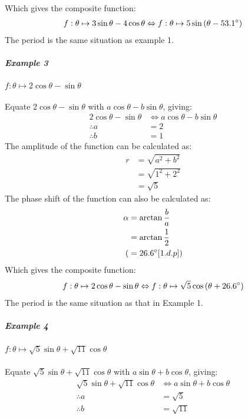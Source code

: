\documentclass{article}
\begin{document}
        Which gives the composite function:
        \begin{align*}
        f:\theta \mapsto 3\sin{\theta} - 4\cos{\theta} \Leftrightarrow f:\theta \mapsto 5\sin{(\theta - 53.1\degree)}
        \end{align*}
        The period is the same situation as example 1. \\
        \subparagraph{Example 3} $f:\theta \mapsto 2\cos{\theta} - \sin{\theta}$ \\\\
        Equate $2\cos{\theta} - \sin{\theta}$ with $a\cos{\theta} - b\sin{\theta}$, giving:
        \begin{align*}
        2\cos{\theta} - \sin{\theta} &\Leftrightarrow a\cos{\theta} - b\sin{\theta} \\
        \therefore a &= 2 \\
        \therefore b &= 1
        \end{align*}
        The amplitude of the function can be calculated as:
        \begin{align*}
        r &= \sqrt{a^2 + b^2} \\
        &= \sqrt{1^2 + 2^2} \\
        &= \sqrt{5}
        \end{align*}
        The phase shift of the function can also be calculated as:
        \begin{align*}
        \alpha &= \arctan{\frac{b}{a}} \\
        &= \arctan{\frac{1}{2}} \\
        (&= 26.6\degree [1.d.p]) 
        \end{align*}
        Which gives the composite function:
        \begin{align*}
        f:\theta \mapsto 2\cos{\theta} - \sin{\theta} \Leftrightarrow f:\theta \mapsto \sqrt{5}\cos{(\theta + 26.6\degree)}
        \end{align*}
        The period is the same situation as that in Example 1.
        \subparagraph{Example 4} $f:\theta \mapsto \sqrt{5}\sin{\theta} + \sqrt{11}\cos{\theta}$ \\\\
        Equate $\sqrt{5}\sin{\theta} + \sqrt{11}\cos{\theta}$ with $a\sin{\theta} + b\cos{\theta}$, giving:
        \begin{align*}
        \sqrt{5}\sin{\theta} + \sqrt{11}\cos{\theta} &\Leftrightarrow a\sin{\theta} + b\cos{\theta} \\
        \therefore a &= \sqrt{5} \\
        \therefore b &= \sqrt{11}
        \end{align*}
\end{document}
